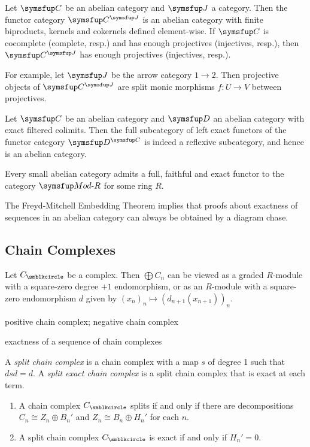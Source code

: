 \begin{example}
  Let $\CAT{C}$ be an abelian category and $\CAT{J}$ a category. Then the functor category $\CAT{C}^{\CAT{J}}$ is an abelian category with finite biproducts, kernels and cokernels defined element-wise. If $\CAT{C}$ is cocomplete (complete, resp.) and has enough projectives (injectives, resp.), then $\CAT{C}^{\CAT{J}}$ has enough projectives (injectives, resp.).

  For example, let $\CAT{J}$ be the arrow category $1\to 2$. Then projective objects of $\CAT{C}^{\CAT{J}}$ are split monic morphisms $f\colon U\to V$ between projectives.
\end{example}

\begin{proposition}[Gabriel]
  Let $\CAT{C}$ be an abelian category and $\CAT{D}$ an abelian category with exact filtered colimits. Then the full subcategory of left exact functors of the functor category $\CAT{D}^{\CAT{C}}$ is indeed a reflexive subcategory, and hence is an abelian category.
\end{proposition}

\begin{theorem}
  Every small abelian category admits a full, faithful and exact functor to the category $\MODR$ for some ring $R$.
\end{theorem}

The Freyd-Mitchell Embedding Theorem implies that proofs about exactness of sequences in an abelian category can always be obtained by a diagram chase.

\subsection{Chain Complexes}

Let $C_\CCCIR$ be a complex. Then $\bigoplus C_n$ can be viewed as a graded $R$-module with a square-zero degree $+1$ endomorphism, or as an $R$-module with a square-zero endomorphism $d$ given by $(x_n)_n\mapsto (d_{n+1}(x_{n+1}))_n$.

positive chain complex; negative chain complex

exactness of a sequence of chain complexes

A \emph{split chain complex} is a chain complex with a map $s$ of degree 1 such that $dsd=d$. A \emph{split exact chain complex} is a split chain complex that is exact at each term.

\begin{proposition}\hspace*{\fill}
  \begin{enumerate}
    \item A chain complex $C_{\CCCIR}$ splits if and only if there are decompositions $C_n\cong Z_n\oplus B_n'$ and $Z_n\cong B_n\oplus H_n'$ for each $n$.
    \item A split chain complex $C_{\CCCIR}$ is exact if and only if $H_n'=0$.
  \end{enumerate}
\end{proposition}

